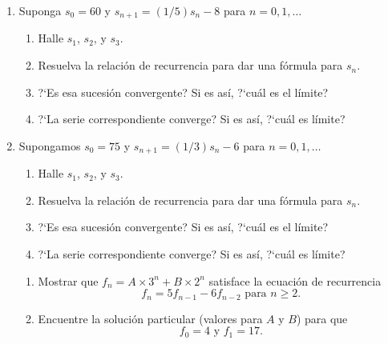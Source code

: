 \begin{enumerate}
    \item Suponga $s_{0}=60$ y $s_{n+1}=(1/5)s_n-8$ para $n=0,1,\ldots$
    \begin{enumerate}
        \item Halle $s_{1}$, $s_{2}$, y $s_{3}$.
        \item Resuelva la relación de recurrencia para dar una fórmula para $s_{n}$.
        \item ?`Es esa sucesión convergente? Si es así, ?`cuál es el límite?
        \item ?`La serie correspondiente converge? Si es así, ?`cuál es límite?
    \end{enumerate}
    \item Supongamos $s_{0}=75$ y $s_{n+1}=(1/3)s_{n}-6$ para $n=0,1,\ldots$
    \begin{enumerate}
        \item Halle $s_{1}$, $s_{2}$, y $s_{3}$.
         \item Resuelva la relación de recurrencia para dar una fórmula para $s_{n}$.
        \item ?`Es esa sucesión convergente? Si es así, ?`cuál es el límite?
        \item ?`La serie correspondiente converge? Si es así, ?`cuál es límite?
    \end{enumerate}
    \begin{enumerate}
        \item Mostrar que $f_{n}=A\times3^{n}+B\times2^{n}$ satisface la ecuación de recurrencia \[ f_{n}=5f_{n-1}-6f_{n-2}\text{ para }n\geq 2. \]
        \item Encuentre la solución particular (valores para $A$ y $B$) para que \[ f_{0}=4\text{ y }f_{1}=17. \]
    \end{enumerate}
\end{enumerate}